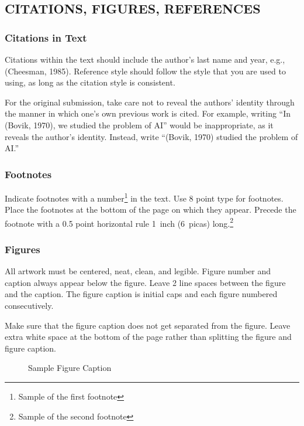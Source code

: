 \subsection{CITATIONS, FIGURES, REFERENCES} 

 
\subsubsection{Citations in Text} 
 
Citations within the text should include the author's last name and
year, e.g., (Cheesman, 1985). Reference style should follow the style
that you are used to using, as long as the citation style is
consistent.

For the original submission, take care not to reveal the authors' identity through
the manner in which one's own previous work is cited.  For example, writing
``In (Bovik, 1970), we studied the problem of AI'' would be inappropriate, as
it reveals the author's identity.  Instead, write ``(Bovik, 1970) studied the
problem of AI.'' 
 
\subsubsection{Footnotes} 
 
Indicate footnotes with a number\footnote{Sample of the first
footnote} in the text. Use 8 point type for footnotes.  Place the
footnotes at the bottom of the page on which they appear.  Precede the
footnote with a 0.5 point horizontal rule 1~inch (6~picas)
long.\footnote{Sample of the second footnote}
 
\subsubsection{Figures}  
 
All artwork must be centered, neat, clean, and legible. Figure number
and caption always appear below the figure.  Leave 2 line spaces
between the figure and the caption. The figure caption is initial caps
and each figure numbered consecutively.
 
Make sure that the figure caption does not get separated from the
figure. Leave extra white space at the bottom of the page rather than
splitting the figure and figure caption.
\begin{figure}[h] 
\vspace{1in} 
\caption{Sample Figure Caption} 
\end{figure} 
 
